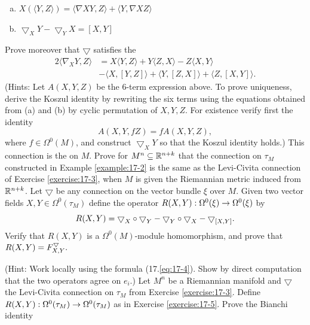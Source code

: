 \begin{enumerate}[\theexercise.1]
    \begin{enumerate}[(a)]
      \item $X( {\langle Y,Z\rangle }) = \langle \nabla {XY},Z\rangle  + \langle Y,\nabla {XZ}\rangle$
      \item ${ \bigtriangledown  }_{X}Y- { \bigtriangledown  }_{Y}X = [  {X,Y}]$
    \end{enumerate}
    Prove moreover that $\bigtriangledown$ satisfies the 
    \[
      \begin{aligned}
        2\langle {\nabla }_{X}Y,Z\rangle  
        & = X\langle Y,Z\rangle  + Y\langle Z,X\rangle - Z\langle X,Y\rangle \\
        & - \langle X,[  {Y,Z}]  \rangle  + \langle Y,[  {Z,X}]  \rangle  + \langle Z,[  {X,Y}]  \rangle.
      \end{aligned}
    \]
    (Hints: Let $A( {X,Y,Z})$ be the 6-term expression above. To prove uniqueness, derive the Koszul identity by rewriting the six terms using the equations obtained from (a) and (b) by cyclic permutation of $X,Y,Z$. For existence verify first the identity
    \[
      A( {X,Y,{fZ}})  = {fA}( {X,Y,Z}),
    \]
    where $f \in  {\Omega }^{0}( M)$, and construct ${ \bigtriangledown  }_{X}Y$ so that the Koszul identity holds.) This connection is the  on $M$.
  \NewItem Prove for ${M}^{n} \subseteq  {\ensuremath{\mathbb{R}}}^{n + k}$ that the connection on ${\tau }_{M}$ constructed in Example \ref{example:17-2} is the same as the Levi-Civita connection of Exercise \ref{exercise:17-3}, when $M$ is given the Riemannian metric induced from ${\mathbb{R}}^{n + k}$.
  \NewItem Let $\bigtriangledown$ be any connection on the vector bundle $\xi$ over $M$. Given two vector fields $X,Y \in  {\Omega }^{0}( {\tau }_{M})$ define the operator $R( {X,Y})  : {\Omega }^{0}( \xi )  \rightarrow  {\Omega }^{0}( \xi )$ by
    \[
      R( {X,Y})  = {\bigtriangledown }_{X} \circ  {\bigtriangledown}_{Y}- {\bigtriangledown }_{Y} \circ  {\bigtriangledown}_{X}- {\bigtriangledown }_{[  X,Y]  }.
    \]
    Verify that $R( {X,Y})$ is a ${\Omega }^{0}( M)$-module homomorphism, and prove that $R( {X,Y})  = {F}_{X,Y}^{\bigtriangledown }.$
    \par(Hint: Work locally using the formula (17.\ref{eq:17-4}). Show by direct computation that the two operators agree on ${e}_{i}$.)
  \NewItem Let ${M}^{n}$ be a Riemannian manifold and $\bigtriangledown$ the Levi-Civita connection on ${\tau }_{M}$ from Exercise \ref{exercise:17-3}. Define $R( {X,Y})  : {\Omega }^{0}( {\tau }_{M})  \rightarrow  {\Omega }^{0}( {\tau }_{M})$ as in Exercise \ref{exercise:17-5}. Prove the Bianchi identity

\end{enumerate}
